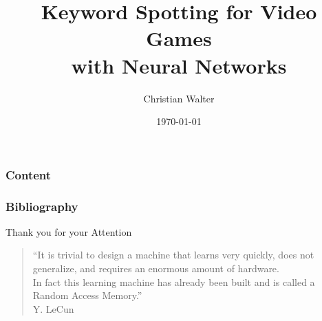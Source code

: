 \documentclass{beamer}
\title[Keyword Spotting for Video Games with Neural Networks]{Keyword Spotting for Video Games\\with Neural Networks}
\author{Christian Walter}
\date{\today}
\begin{document}
\titleframe

\begin{frame}
  \frametitle{Content}
  \tableofcontents
\end{frame}














\begin{frame}
  \frametitle{Bibliography}
  \printbibliography[heading=bibintoc]
\end{frame}

\begin{frame}
  \Large
  \centering
  \vfill
  Thank you for your Attention
  \begin{quote}
    \scriptsize
    \vspace{1cm}
    \enquote{It is trivial to design a machine that learns very quickly, does not generalize, and requires an enormous amount of hardware.\\
    In fact this learning machine has already been built and is called a Random Access Memory.}\\
    \vspace{0.25cm}
    Y. LeCun
  \end{quote}
\end{frame}
\end{document}
